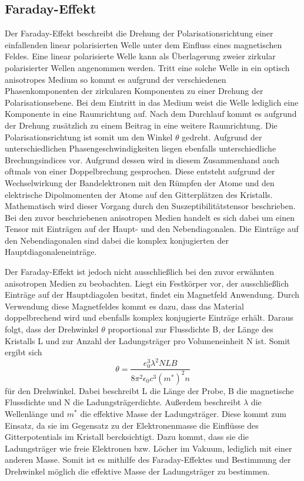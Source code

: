 \subsection{Faraday-Effekt}
Der Faraday-Effekt beschreibt die Drehung der Polarisationsrichtung einer einfallenden linear 
polarisierten Welle unter dem Einfluss eines magnetischen Feldes. Eine linear polarisierte Welle 
kann als Überlagerung zweier zirkular polarisierter Wellen angenommen werden. Tritt eine solche Welle in 
ein optisch anisotropes Medium so kommt es aufgrund der verschiedenen Phasenkomponenten der zirkularen
Komponenten zu einer Drehung der Polarisationsebene. Bei dem Eintritt in das Medium weist die Welle 
lediglich eine Komponente in eine Raumrichtung auf. Nach dem Durchlauf kommt es aufgrund der Drehung 
zusätzlich zu einem Beitrag in eine weitere Raumrichtung. Die Polarisationsrichtung ist somit um den 
Winkel $\theta$ gedreht. Aufgrund der unterschiedlichen Phasengeschwindigkeiten liegen ebenfalls 
unterschiedliche Brechungsindices vor. Aufgrund dessen wird in diesem Zusammenhand auch oftmals von einer 
Doppelbrechung gesprochen. Diese entsteht aufgrund der
Wechselwirkung der Bandelektronen mit den Rümpfen der Atome und 
den elektrische Dipolmomenten der Atome auf den Gitterplätzen des Kristalls. \\
Mathematisch wird dieser Vorgang durch den Suszeptibilitätstensor beschrieben. Bei den zuvor beschriebenen 
anisotropen Medien handelt es sich dabei um einen Tensor mit Einträgen auf der Haupt- und den Nebendiagonalen. 
Die Einträge auf den Nebendiagonalen sind dabei die komplex konjugierten der Hauptdiagonaleneinträge. \\
\par 
Der Faraday-Effekt ist jedoch nicht ausschließlich bei den zuvor erwähnten anisotropen Medien zu beobachten. 
Liegt ein Festkörper vor, der ausschließlich Einträge auf der Hauptdiagolen besitzt, findet ein 
Magnetfeld Anwendung. Durch Verwendung diese Magnetfeldes kommt es dazu, dass das Material doppelbrechend wird 
und ebenfalls komplex konjugierte Einträge erhält. Daraus folgt, dass der Drehwinkel $\theta$ 
proportional zur Flussdichte B, der Länge des Kristalls L und zur Anzahl der Ladungsträger pro Volumeneinheit N
ist. Somit ergibt sich 
\begin{equation}
    \theta = \frac{e_0^3 \lambda ^2 N L B}{8 \pi^2 \epsilon_0 c^3 (m^*)^2 n}
    \label{eqn:effmass}
\end{equation} \noindent
für den Drehwinkel. Dabei beschreibt L die Länge der Probe, B die magnetische Flussdichte und N die 
Ladungsträgerdichte. Außerdem beschreibt $\lambda$ die Wellenlänge und $m^*$ die effektive Masse der
Ladungsträger. Diese kommt zum Einsatz, da sie im Gegensatz zu der Elektronenmasse die Einflüsse des 
Gitterpotentials im Kristall bercksichtigt. Dazu kommt, dass sie die Ladungsträger wie freie Elektronen bzw. 
Löcher im Vakuum, lediglich mit einer anderen Masse. Somit ist es mithilfe des Faraday-Effektes und Bestimmung
der Drehwinkel möglich die effektive Masse der Ladungsträger zu bestimmen.